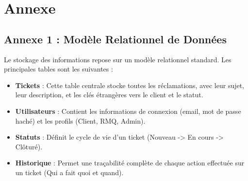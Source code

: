 \chapter*{Annexe}

\section*{Annexe 1 : Modèle Relationnel de Données}
Le stockage des informations repose sur un modèle relationnel standard. Les principales tables sont les suivantes :

\begin{itemize}
    \item \textbf{Tickets} : Cette table centrale stocke toutes les réclamations, avec leur sujet, leur description, et les clés étrangères vers le client et le statut.
    \item \textbf{Utilisateurs} : Contient les informations de connexion (email, mot de passe haché) et les profils (Client, RMQ, Admin).
    \item \textbf{Statuts} : Définit le cycle de vie d'un ticket (Nouveau -> En cours -> Clôturé).
    \item \textbf{Historique} : Permet une traçabilité complète de chaque action effectuée sur un ticket (Qui a fait quoi et quand).
\end{itemize}
